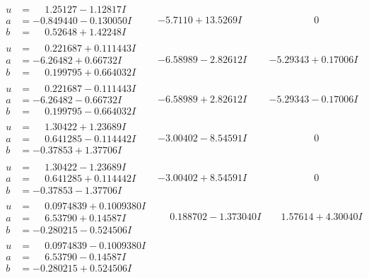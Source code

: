 \documentclass[1p]{elsarticle_modified}
\theoremstyle{definition}
\begin{document}
$$\begin{array}{c|c|c}
\begin{aligned}
u &= \phantom{-}1.25127 - 1.12817 I \\
a &= -0.849440 - 0.130050 I \\
b &= \phantom{-}0.52648 + 1.42248 I\end{aligned}
 & -5.7110 + 13.5269 I & \phantom{-0.000000 } 0 \\ \hline\begin{aligned}
u &= \phantom{-}0.221687 + 0.111443 I \\
a &= -6.26482 + 0.66732 I \\
b &= \phantom{-}0.199795 + 0.664032 I\end{aligned}
 & -6.58989 - 2.82612 I & -5.29343 + 0.17006 I \\ \hline\begin{aligned}
u &= \phantom{-}0.221687 - 0.111443 I \\
a &= -6.26482 - 0.66732 I \\
b &= \phantom{-}0.199795 - 0.664032 I\end{aligned}
 & -6.58989 + 2.82612 I & -5.29343 - 0.17006 I \\ \hline\begin{aligned}
u &= \phantom{-}1.30422 + 1.23689 I \\
a &= \phantom{-}0.641285 - 0.114442 I \\
b &= -0.37853 + 1.37706 I\end{aligned}
 & -3.00402 - 8.54591 I & \phantom{-0.000000 } 0 \\ \hline\begin{aligned}
u &= \phantom{-}1.30422 - 1.23689 I \\
a &= \phantom{-}0.641285 + 0.114442 I \\
b &= -0.37853 - 1.37706 I\end{aligned}
 & -3.00402 + 8.54591 I & \phantom{-0.000000 } 0 \\ \hline\begin{aligned}
u &= \phantom{-}0.0974839 + 0.1009380 I \\
a &= \phantom{-}6.53790 + 0.14587 I \\
b &= -0.280215 - 0.524506 I\end{aligned}
 & \phantom{-}0.188702 - 1.373040 I & \phantom{-}1.57614 + 4.30040 I \\ \hline\begin{aligned}
u &= \phantom{-}0.0974839 - 0.1009380 I \\
a &= \phantom{-}6.53790 - 0.14587 I \\
b &= -0.280215 + 0.524506 I\end{aligned}

\end{array}$$
\end{document}
